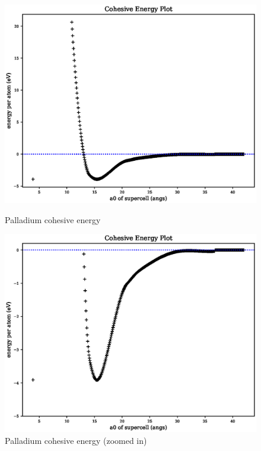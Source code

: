 \begin{figure}[ht] 
  \begin{minipage}[b]{0.4\linewidth}
    \centering
    \includegraphics[width=.9\linewidth]{chapters/results_potential_fitting/pot_fepd_fcc_2/pd_cohesive_energy.eps} 
    \caption{Palladium cohesive energy}  
    \label{fig:pdv2cohesive}
  \end{minipage}%
  \begin{minipage}[b]{0.4\linewidth}
    \centering
    \includegraphics[width=.9\linewidth]{chapters/results_potential_fitting/pot_fepd_fcc_2/pd_cohesive_energy_zoom.eps} 
    \caption{Palladium cohesive energy (zoomed in)}
    \label{fig:pdv2cohesivezoom}  
  \end{minipage}%
\end{figure}


